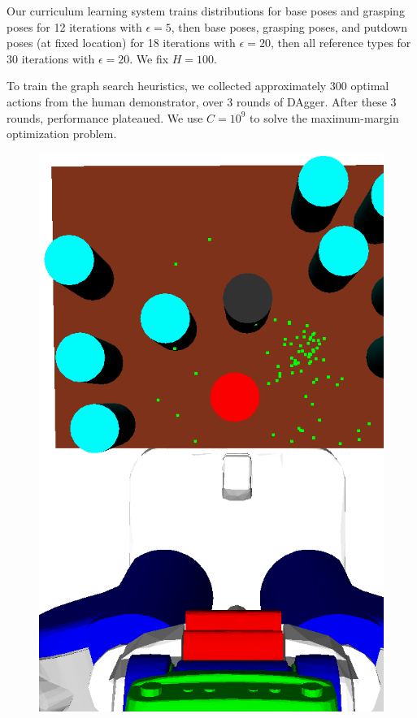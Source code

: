 Our curriculum learning system trains distributions for base poses and
grasping poses for 12 iterations with $\epsilon = 5$, then base poses,
grasping poses, and putdown poses (at fixed location) for 18
iterations with $\epsilon = 20$, then all reference types for 30
iterations with $\epsilon = 20$. We fix $H = 100$.

To train the graph search heuristics, we collected approximately 300
optimal actions from the human demonstrator, over 3 rounds of {\sc
  DAgger}. After these 3 rounds, performance plateaued. We use $C =
10^{9}$ to solve the maximum-margin optimization problem.

\begin{figure}[t]
  \centering
    \noindent
    \includegraphics[scale=0.13]{images/grasp_context_1.png}

\end{figure}

